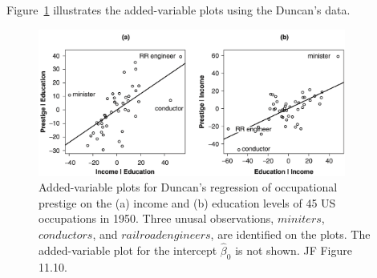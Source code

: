 Figure~\ref{fig:duncan_avp} illustrates the added-variable plots using the Duncan's data.
%
\begin{figure}[H]
\begin{center}
  \includegraphics[width=0.9\textwidth]{Lecture17/JF_11_10}
  \caption{
  Added-variable plots for Duncan's regression of occupational prestige on the (a) income and (b) education levels of 45 US occupations in 1950.
  Three unusal observations, $miniters$, $conductors$, and $railroad engineers$, are identified on the plots.
  The added-variable plot for the intercept $\hat{\beta}_0$ is not shown.
   JF Figure 11.10.}
  \label{fig:duncan_avp}
\end{center}
\end{figure}
%

